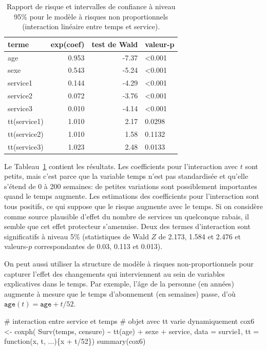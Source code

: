 \documentclass[
  11pt,
  letterpaper,
]{scrbook}
\newenvironment{Shaded}{\begin{snugshade}}{\end{snugshade}}
\newcommand{\AttributeTok}[1]{\textcolor[rgb]{0.40,0.45,0.13}{#1}}
\newcommand{\CommentTok}[1]{\textcolor[rgb]{0.37,0.37,0.37}{#1}}
\newcommand{\ControlFlowTok}[1]{\textcolor[rgb]{0.00,0.23,0.31}{#1}}
\newcommand{\DecValTok}[1]{\textcolor[rgb]{0.68,0.00,0.00}{#1}}
\newcommand{\FunctionTok}[1]{\textcolor[rgb]{0.28,0.35,0.67}{#1}}
\newcommand{\NormalTok}[1]{\textcolor[rgb]{0.00,0.23,0.31}{#1}}
\newcommand{\OtherTok}[1]{\textcolor[rgb]{0.00,0.23,0.31}{#1}}
\newcommand{\SpecialCharTok}[1]{\textcolor[rgb]{0.37,0.37,0.37}{#1}}
\theoremstyle{definition}
\theoremstyle{remark}
\begin{document}
\hypertarget{tbl-coxnph}{}
\begin{table}
\caption{\label{tbl-coxnph}Rapport de risque et intervalles de confiance à niveau 95\% pour le
modèle à risques non proportionnels (interaction linéaire entre temps et
service). }\tabularnewline

\centering
\begin{tabular}{lrrl}
\toprule
terme & exp(coef) & test de Wald & valeur-p\\
\midrule
age & 0.953 & -7.37 & <0.001\\
sexe & 0.543 & -5.24 & <0.001\\
service1 & 0.144 & -4.29 & <0.001\\
service2 & 0.072 & -3.76 & <0.001\\
service3 & 0.010 & -4.14 & <0.001\\
\addlinespace
tt(service1) & 1.010 & 2.17 & 0.0298\\
tt(service2) & 1.010 & 1.58 & 0.1132\\
tt(service3) & 1.023 & 2.48 & 0.0133\\
\bottomrule
\end{tabular}
\end{table}

Le Tableau~\ref{tbl-coxnph} contient les résultats. Les coefficients
pour l'interaction avec \(t\) sont petits, mais c'est parce que la
variable temps n'est pas standardisée et qu'elle s'étend de 0 à 200
semaines: de petites variations sont possiblement importantes quand le
temps augmente. Les estimations des coefficients pour l'interaction sont
tous positifs, ce qui suppose que le risque augmente avec le temps. Si
on considère comme source plausible d'effet du nombre de services un
quelconque rabais, il semble que cet effet protecteur s'amenuise. Deux
des termes d'interaction sont significatifs à niveau 5\% (statistiques
de Wald \(Z\) de 2.173, 1.584 et 2.476 et valeurs-\(p\) correspondantes
de 0.03, 0.113 et 0.013).

On peut aussi utiliser la structure de modèle à risques
non-proportionnels pour capturer l'effet des changements qui
interviennent au sein de variables explicatives dans le temps. Par
exemple, l'âge de la personne (en années) augmente à mesure que le temps
d'abonnement (en semaines) passe, d'où
\(\texttt{age}(t) = \texttt{age} + t/52\).

\begin{Shaded}
\begin{Highlighting}[]
\CommentTok{\# interaction entre service et temps}
\CommentTok{\# objet avec \textquotesingle{}tt\textquotesingle{} varie dynamiquement}
\NormalTok{cox6 }\OtherTok{\textless{}{-}} \FunctionTok{coxph}\NormalTok{(}
    \FunctionTok{Surv}\NormalTok{(temps, censure) }\SpecialCharTok{\textasciitilde{}} 
     \FunctionTok{tt}\NormalTok{(age) }\SpecialCharTok{+}\NormalTok{ sexe }\SpecialCharTok{+}\NormalTok{ service, }
     \AttributeTok{data =}\NormalTok{ survie1, }
     \AttributeTok{tt =} \ControlFlowTok{function}\NormalTok{(x, t, ...)\{x }\SpecialCharTok{+}\NormalTok{ t}\SpecialCharTok{/}\DecValTok{52}\NormalTok{\})}
\FunctionTok{summary}\NormalTok{(cox6)}
\end{Highlighting}
\end{Shaded}
\end{document}
